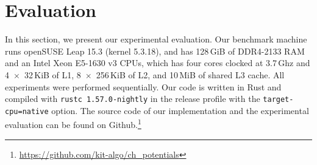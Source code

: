 \documentclass[manuscript]{acmart}
\begin{document}



\section{Evaluation}
\label{sec:experiments}

In this section, we present our experimental evaluation.
Our benchmark machine runs openSUSE Leap 15.3 (kernel 5.3.18), and has 128\,GiB of DDR4-2133 RAM and an Intel Xeon E5-1630 v3 CPUs, which has four cores clocked at 3.7\,Ghz and 4~$\times$~32\,KiB of L1, 8~$\times$~256\,KiB of L2, and 10\,MiB of shared L3 cache.
All experiments were performed sequentially.
Our code is written in Rust and compiled with \texttt{rustc 1.57.0-nightly} in the release profile with the \texttt{target-cpu=native} option.
The source code of our implementation and the experimental evaluation can be found on Github.\footnote{\url{https://github.com/kit-algo/ch_potentials}}
\end{document}
